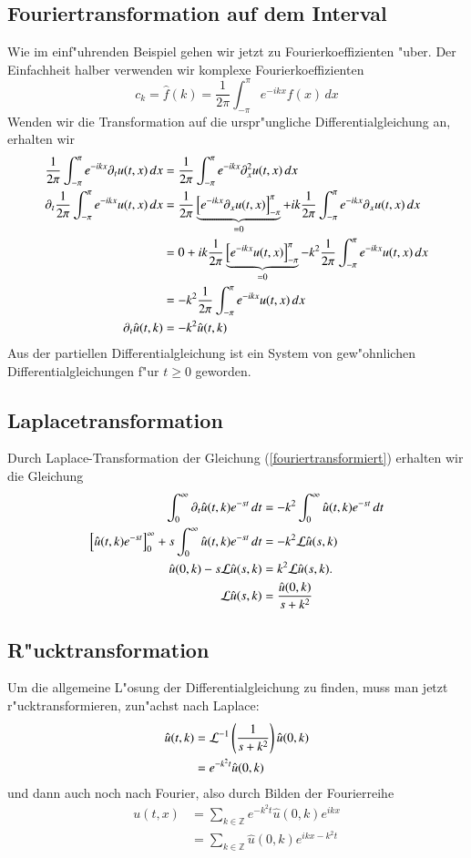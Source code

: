 \subsection{Fouriertransformation auf dem Interval}
Wie im einf"uhrenden Beispiel gehen wir jetzt zu Fourierkoeffizienten
"uber.
Der Einfachheit halber verwenden wir komplexe Fourierkoeffizienten
\[
c_k=\hat f(k)=\frac1{2\pi}\int_{-\pi}^{\pi}e^{-ikx}f(x)\,dx
\]
Wenden wir die Transformation auf die urspr"ungliche Differentialgleichung
an, erhalten wir
\begin{align}
\frac1{2\pi}\int_{-\pi}^{\pi}e^{-ikx}\partial_t u(t,x)\,dx
&=\frac1{2\pi}\int_{-\pi}^{\pi}e^{-ikx}\partial_x^2 u(t,x)\,dx
\notag
\\
\partial_t\frac1{2\pi}\int_{-\pi}^{\pi}e^{-ikx} u(t,x)\,dx
&=
\frac1{2\pi}
\underbrace{
\left[
e^{-ikx}\partial_x u(t,x)
\right]_{-\pi}^{\pi}}_{=0}
+
ik\frac1{2\pi}\int_{-\pi}^{\pi}e^{-ikx}\partial_x u(t,x)\,dx
\notag
\\
&=
0 + 
ik\frac1{2\pi}
\underbrace{
\left[
e^{-ikx}u(t,x)
\right]_{-\pi}^{\pi}}_{=0}
-
k^2\frac1{2\pi}\int_{-\pi}^{\pi}e^{-ikx} u(t,x)\,dx
\notag
\\
&=
-
k^2\frac1{2\pi}\int_{-\pi}^{\pi}e^{-ikx} u(t,x)\,dx
\notag
\\
\partial_t\hat u(t,k)&=-k^2 \hat u(t,k)
\label{fouriertransformiert}
\end{align}
Aus der partiellen Differentialgleichung ist ein System von gew"ohnlichen
Differentialgleichungen f"ur $t\ge 0$ geworden.

\subsection{Laplacetransformation}
Durch Laplace-Transformation der Gleichung (\ref{fouriertransformiert})
erhalten wir die Gleichung
\begin{align*}
\int_0^{\infty} \partial_t \hat u(t,k)e^{-st}\,dt
&=
-k^2\int_0^{\infty}\hat u(t,k)e^{-st}\,dt
\\
\left[\hat u(t,k)e^{-st}\right]_0^{\infty}
+
s\int_0^{\infty}\hat u(t,k)e^{-st}\,dt
&=
-k^2{\cal L}\hat u(s,k)
\\
\hat u(0,k)-s{\cal L}\hat u(s,k)&=k^2{\cal L}\hat u(s,k).
\\
{\cal L}\hat u(s,k)&=\frac{\hat u(0,k)}{s+k^2}
\end{align*}

\subsection{R"ucktransformation}
Um die allgemeine L"osung der Differentialgleichung zu finden,
muss man jetzt r"ucktransformieren, zun"achst nach Laplace:
\begin{align*}
\hat u(t,k)&={\cal L}^{-1}\left(\frac1{s+k^2}\right)\hat u(0,k)
\\
&=e^{-k^2t}\hat u(0,k)
\end{align*}
und dann auch noch nach Fourier, also durch Bilden der Fourierreihe
\begin{align*}
u(t,x)&=\sum_{k\in\mathbb Z}e^{-k^2t}\hat u(0,k)e^{ikx}
\\
&=\sum_{k\in\mathbb Z}\hat u(0,k)e^{ikx-k^2t}
\end{align*}

